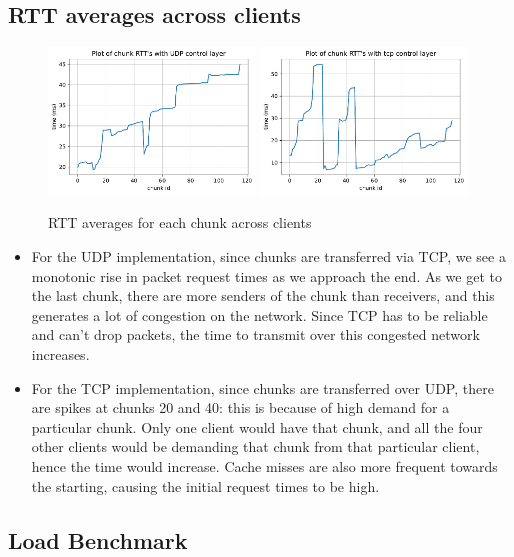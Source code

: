 \documentclass[12pt]{article}
\begin{document}
\subsection{RTT averages across clients}

\begin{figure}[H]
  \centering
  \includegraphics[width=0.49\textwidth]{udp_plot.pdf}
  \includegraphics[width=0.49\textwidth]{tcp_plot.pdf}
  \caption{RTT averages for each chunk across clients}
\end{figure}

\begin{itemize}
  \item For the UDP implementation, since chunks are transferred via TCP, we see a monotonic rise in packet request times as we approach the end. As we get to the last chunk, there are more senders of the chunk than receivers, and this generates a lot of congestion on the network. Since TCP has to be reliable and can't drop packets, the time to transmit over this congested network increases.
  \item For the TCP implementation, since chunks are transferred over UDP, there are spikes at chunks 20 and 40: this is because of high demand for a particular chunk. Only one client would have that chunk, and all the four other clients would be demanding that chunk from that particular client, hence the time would increase. Cache misses are also more frequent towards the starting, causing the initial request times to be high.
\end{itemize}

\subsection{Load Benchmark}
\end{document}
